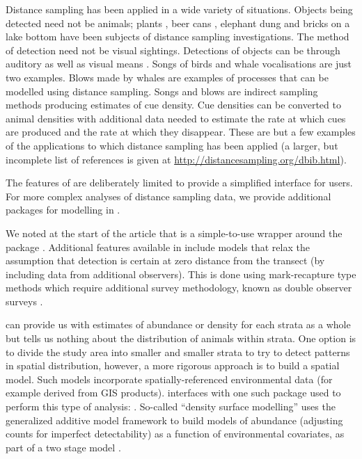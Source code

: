 \documentclass[article]{jss}
\begin{document}
Distance sampling has been applied in a wide variety of situations.
Objects being detected need not be animals; plants
\citep{Buckland:2007kl}, beer cans \citep{Otto:1990gs}, elephant dung
\citep{NchPlu01} and bricks on a lake bottom \citep{Ber90} have been
subjects of distance sampling investigations. The method of detection
need not be visual sightings. Detections of objects can be through
auditory as well as visual means \citep{Marques2013b}. Songs of birds
\citep{Buckland2006} and whale vocalisations \citep{BorSub1} are just
two examples. Blows made by whales are examples of processes that can be
modelled using distance sampling. Songs and blows are indirect sampling
methods producing estimates of cue density. Cue densities can be
converted to animal densities with additional data needed to estimate
the rate at which cues are produced and the rate at which they
disappear. These are but a few examples of the applications to which
distance sampling has been applied (a larger, but incomplete list of
references is given at \url{http://distancesampling.org/dbib.html}).

The features of  are deliberately limited to provide a
simplified interface for users. For more complex analyses of distance
sampling data, we provide additional packages for modelling in
.

We noted at the start of the article that  is a
simple-to-use wrapper around the package . Additional features
available in  include models that relax the assumption that
detection is certain at zero distance from the transect (by including
data from additional observers). This is done using mark-recapture type
methods which require additional survey methodology, known as double
observer surveys \citep[see][ for an introduction]{Burt:2014gu}.

 can provide us with estimates of abundance or density for
each strata as a whole but tells us nothing about the distribution of
animals within strata. One option is to divide the study area into
smaller and smaller strata to try to detect patterns in spatial
distribution, however, a more rigorous approach is to build a spatial
model. Such models incorporate spatially-referenced environmental data
(for example derived from GIS products).  interfaces with
one such package used to perform this type of analysis: 
\citep{dsm-pkg}. So-called ``density surface modelling'' uses the
generalized additive model framework \citep[e.g.][]{Wood:2006vg} to
build models of abundance (adjusting counts for imperfect detectability)
as a function of environmental covariates, as part of a two stage model
\citep{Hedley:2004et, Miller:2013fq}.
\end{document}
